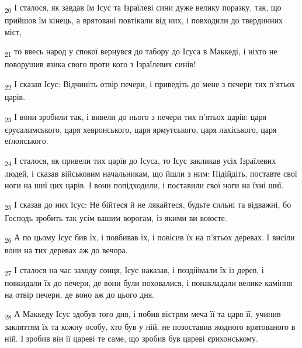 \begin{tcolorbox}
\textsubscript{20} І сталося, як завдав їм Ісус та Ізраїлеві сини дуже велику поразку, так, що прийшов їм кінець, а врятовані повтікали від них, і повходили до твердинних міст,
\end{tcolorbox}
\begin{tcolorbox}
\textsubscript{21} то ввесь народ у спокої вернувся до табору до Ісуса в Маккеді, і ніхто не поворушив язика свого проти кого з Ізраїлевих синів!
\end{tcolorbox}
\begin{tcolorbox}
\textsubscript{22} І сказав Ісус: Відчиніть отвір печери, і приведіть до мене з печери тих п'ятьох царів.
\end{tcolorbox}
\begin{tcolorbox}
\textsubscript{23} І вони зробили так, і вивели до нього з печери тих п'ятьох царів: царя єрусалимського, царя хевронського, царя ярмутського, царя лахіського, царя еґлонського.
\end{tcolorbox}
\begin{tcolorbox}
\textsubscript{24} І сталося, як привели тих царів до Ісуса, то Ісус закликав усіх Ізраїлевих людей, і сказав військовим начальникам, що йшли з ним: Підійдіть, поставте свої ноги на шиї цих царів. І вони попідходили, і поставили свої ноги на їхні шиї.
\end{tcolorbox}
\begin{tcolorbox}
\textsubscript{25} І сказав до них Ісус: Не бійтеся й не лякайтеся, будьте сильні та відважні, бо Господь зробить так усім вашим ворогам, із якими ви воюєте.
\end{tcolorbox}
\begin{tcolorbox}
\textsubscript{26} А по цьому Ісус бив їх, і повбивав їх, і повісив їх на п'ятьох деревах. І висіли вони на тих деревах аж до вечора.
\end{tcolorbox}
\begin{tcolorbox}
\textsubscript{27} І сталося на час заходу сонця, Ісус наказав, і поздіймали їх із дерев, і повкидали їх до печери, де вони були поховалися, і понакладали велике каміння на отвір печери, де воно аж до цього дня.
\end{tcolorbox}
\begin{tcolorbox}
\textsubscript{28} А Маккеду Ісус здобув того дня, і побив вістрям меча її та царя її, учинив закляттям їх та кожну особу, хто був у ній, не позоставив жодного врятованого в ній. І зробив він її цареві те саме, що зробив був цареві єрихонському.
\end{tcolorbox}
